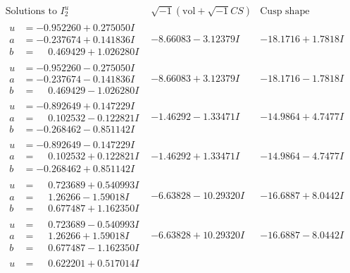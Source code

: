 \documentclass[1p]{elsarticle_modified}
\theoremstyle{definition}
\newcommand{\I}{\sqrt{-1}}
\begin{document}
$$\begin{array}{c|c|c}  
\text{Solutions to }I^u_{2}& \I (\text{vol} + \sqrt{-1}CS) & \text{Cusp shape}\\
 \hline 
\begin{aligned}
u &= -0.952260 + 0.275050 I \\
a &= -0.237674 + 0.141836 I \\
b &= \phantom{-}0.469429 + 1.026280 I\end{aligned}
 & -8.66083 - 3.12379 I & -18.1716 + 1.7818 I \\ \hline\begin{aligned}
u &= -0.952260 - 0.275050 I \\
a &= -0.237674 - 0.141836 I \\
b &= \phantom{-}0.469429 - 1.026280 I\end{aligned}
 & -8.66083 + 3.12379 I & -18.1716 - 1.7818 I \\ \hline\begin{aligned}
u &= -0.892649 + 0.147229 I \\
a &= \phantom{-}0.102532 - 0.122821 I \\
b &= -0.268462 - 0.851142 I\end{aligned}
 & -1.46292 - 1.33471 I & -14.9864 + 4.7477 I \\ \hline\begin{aligned}
u &= -0.892649 - 0.147229 I \\
a &= \phantom{-}0.102532 + 0.122821 I \\
b &= -0.268462 + 0.851142 I\end{aligned}
 & -1.46292 + 1.33471 I & -14.9864 - 4.7477 I \\ \hline\begin{aligned}
u &= \phantom{-}0.723689 + 0.540993 I \\
a &= \phantom{-}1.26266 - 1.59018 I \\
b &= \phantom{-}0.677487 + 1.162350 I\end{aligned}
 & -6.63828 - 10.29320 I & -16.6887 + 8.0442 I \\ \hline\begin{aligned}
u &= \phantom{-}0.723689 - 0.540993 I \\
a &= \phantom{-}1.26266 + 1.59018 I \\
b &= \phantom{-}0.677487 - 1.162350 I\end{aligned}
 & -6.63828 + 10.29320 I & -16.6887 - 8.0442 I \\ \hline\begin{aligned}
u &= \phantom{-}0.622201 + 0.517014 I \\

\end{aligned}
\end{array}$$
\end{document}

